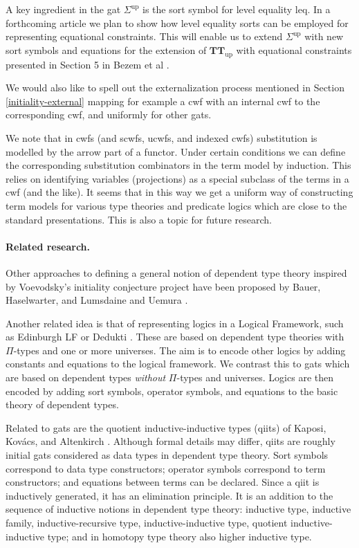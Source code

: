 \documentclass[11pt,a4paper]{article}
\theoremstyle{plain}
\theoremstyle{definition}
\def\leq{\mathrm{leq}}
\def\Sigmaint{{\Sigma^\mathrm{up}}}
\def\TTint{{\mathbf{TT}_\mathrm{up}}}
\begin{document}
A key ingredient in the gat $\Sigmaint$ is the sort symbol for level equality $\leq$. In a forthcoming article we plan to show how level equality sorts can be employed for representing equational constraints. This will enable us to extend $\Sigmaint$ with new sort symbols and equations for the extension of $\TTint$ with equational constraints presented in Section 5 in Bezem et al \cite{BezemCDE22}.

We would also like to spell out the externalization process mentioned in Section \ref{initiality-external} mapping for example a cwf with an internal cwf to the corresponding cwf, and uniformly for other gats.

We note that in cwfs (and scwfs, ucwfs, and indexed cwfs) substitution is modelled by the arrow part of a functor. Under certain conditions we can define the corresponding substitution combinators in the term model by induction. This relies on identifying variables (projections) as a special subclass of the terms in a cwf (and the like). It seems that in this way we get a uniform way of constructing term models for various type theories and predicate logics which are close to the standard presentations. This is also a topic for future research.

\paragraph{Related research.}
Other approaches to defining a general notion of dependent type theory inspired by Voevodsky's initiality conjecture project have been proposed by Bauer, Haselwarter, and Lumsdaine \cite{BauerHL20} and Uemura \cite{Uemura23}.

Another related idea is that of representing logics in a {Logical Framework}, such as Edinburgh LF \cite{harper-honsell-plotkin} or Dedukti \cite{dowek-dedukti}. These are based on dependent type theories with $\Pi$-types and one or more universes. The aim is to encode other logics by adding constants and equations to the logical framework. We contrast this to gats which are based on dependent types {\em without} $\Pi$-types and universes. Logics are then encoded by adding sort symbols, operator symbols, and equations to the basic theory of dependent types.

Related to gats are the quotient inductive-inductive types (qiits) of Kaposi, Kov{\'{a}}cs, and Altenkirch
\cite{kaposi:qiits,kovacs:phd}. Although formal details may differ, qiits are roughly initial gats considered as data types in dependent type theory. Sort symbols correspond to data type constructors; operator symbols correspond to term constructors; and equations between terms can be declared. Since a qiit is inductively generated, it has an elimination principle. It is an addition to the sequence of inductive notions in dependent type theory: inductive type, inductive family, inductive-recursive type, inductive-inductive type, quotient inductive-inductive type; and in homotopy type theory also higher inductive type.
\end{document}
